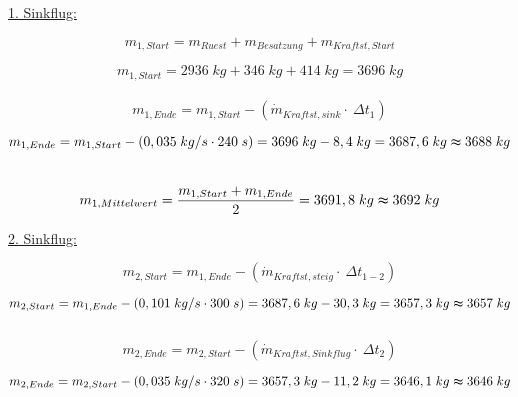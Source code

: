 \underline{1. Sinkflug:}

\begin{equation*}
m_{1,Start} = m_{Ruest} + m_{Besatzung} + m_{Kraftst,Start}
\end{equation*}

\begin{equation*}
m_{1,Start} = 2936 \; {kg} + 346 \; {kg} +414 \; {kg} = 3696 \; {kg}
\end{equation*}
\\

\begin{equation*}
m_{1,Ende} = m_{1,Start} - (\dot{m}_{Kraftst,sink} \cdot \ \Delta t_1)
\end{equation*}

\begin{equation*}
m_{1,Ende} = m_{1,Start} - (0,035 \; {kg/s} \cdot 240 \; {s}) = 3696 \; {kg} - 8,4 \; {kg} = 3687,6 \; {kg} \thickapprox 3688 \; {kg}
\end{equation*} \\

\begin{equation*}
m_{1,Mittelwert} = \frac{m_{1,Start} + m_{1,Ende}}{2} = 3691,8 \; {kg} \thickapprox 3692 \; {kg}
\end{equation*}

\vspace{5mm}
\underline{2. Sinkflug:}

\begin{equation*}
m_{2,Start} = m_{1,Ende} - (\dot{m}_{Kraftst,steig} \cdot \ \Delta t_{1-2})
\end{equation*}

\begin{equation*}
m_{2,Start} = m_{1,Ende} - (0,101 \; {kg/s} \cdot 300 \; {s}) = 3687,6 \; {kg} - 30,3 \; {kg} = 3657,3 \; {kg} \thickapprox 3657 \; {kg}
\end{equation*} \\

\begin{equation*}
m_{2,Ende} = m_{2,Start} - (\dot{m}_{Kraftst,Sinkflug} \cdot \ \Delta t_2)
\end{equation*}

\begin{equation*}
m_{2,Ende} = m_{2,Start} - (0,035 \; {kg/s} \cdot 320 \; {s}) = 3657,3 \; {kg} - 11,2 \; {kg} = 3646,1 \; {kg} \thickapprox 3646 \; {kg}
\end{equation*} \\

